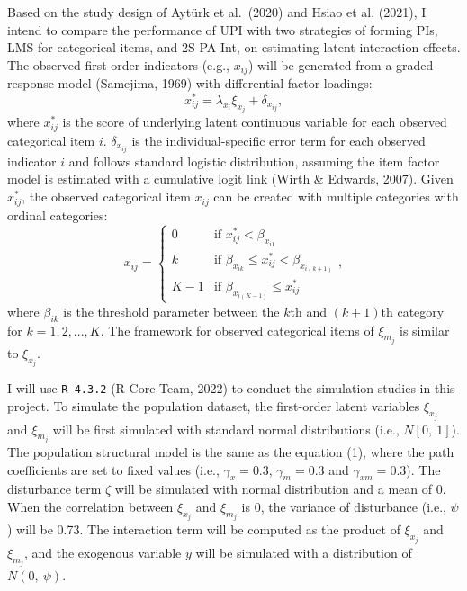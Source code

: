 \documentclass[
  man]{apa6}
\begin{document}
Based on the study design of Aytürk et al.~(2020) and Hsiao et al. (2021), I intend to compare the performance of UPI with two strategies of forming PIs, LMS for categorical items, and 2S-PA-Int, on estimating latent interaction effects. The observed first-order indicators (e.g., \(x_{ij}\)) will be generated from a graded response model (Samejima, 1969) with differential factor loadings:
\begin{equation}
x_{ij}^* = \lambda_{x_{i}}\xi_{x_{j}} + \delta_{x_{ij}},
\end{equation}
where \(x_{ij}^*\) is the score of underlying latent continuous variable for each observed categorical item \(i\). \(\delta_{x_{ij}}\) is the individual-specific error term for each observed indicator \(i\) and follows standard logistic distribution, assuming the item factor model is estimated with a cumulative logit link (Wirth \& Edwards, 2007). Given \(x_{ij}^*\), the observed categorical item \(x_{ij}\) can be created with multiple categories with ordinal categories:
\begin{equation}
  x_{ij} =
    \begin{cases}
      0 & \text{if $x_{ij}^* < \beta_{x_{i1}}$}\\
      k & \text{if $\beta_{x_{ik}} \le x_{ij}^* < \beta_{x_{i(k + 1)}}$}\\
      K - 1 & \text{if $\beta_{x_{i(K - 1)}} \le x_{ij}^*$}
    \end{cases},      
\end{equation}
where \(\beta_{ik}\) is the threshold parameter between the \(k\)th and \((k + 1)\)th category for \(k = 1, 2,...,K\). The framework for observed categorical items of \(\xi_{m_{j}}\) is similar to \(\xi_{x_{j}}\).

I will use \texttt{R\ 4.3.2} (R Core Team, 2022) to conduct the simulation studies in this project. To simulate the population dataset, the first-order latent variables \(\xi_{x_{j}}\) and \(\xi_{m_{j}}\) will be first simulated with standard normal distributions (i.e., \(N[0, \ 1]\)). The population structural model is the same as the equation (1), where the path coefficients are set to fixed values (i.e., \(\gamma_{x} = 0.3\), \(\gamma_{m} = 0.3\) and \(\gamma_{xm} = 0.3\)). The disturbance term \(\zeta\) will be simulated with normal distribution and a mean of 0. When the correlation between \(\xi_{x_{j}}\) and \(\xi_{m_{j}}\) is 0, the variance of disturbance (i.e., \(\psi\)) will be 0.73. The interaction term will be computed as the product of \(\xi_{x_{j}}\) and \(\xi_{m_{j}}\), and the exogenous variable \(y\) will be simulated with a distribution of \(N(0, \ \psi)\).
\end{document}
